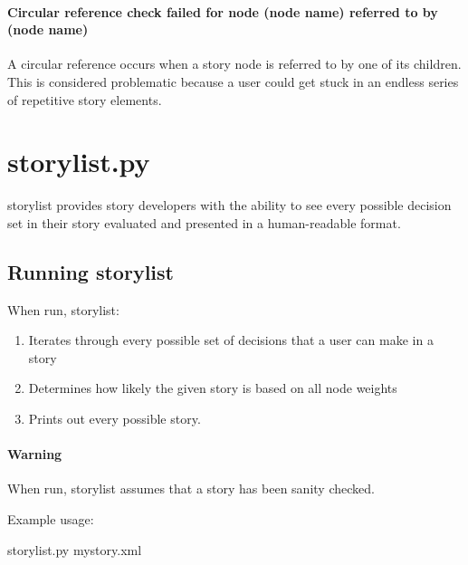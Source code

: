 \documentclass[12pt,letterpaper]{article}
\begin{document}
 \paragraph{Circular reference check failed for node (node name) referred to by (node name)}
 A circular reference occurs when a story node is referred to by one of its children. This is considered 
 problematic because a user could get stuck in an endless series of repetitive story elements.
 
 
 \section{storylist.py}
 storylist provides story developers with the ability to see every possible decision set in their story evaluated and
 presented in a human-readable format.
 
 \subsection{Running storylist}
 When run, storylist:
 \begin{enumerate}
 \item Iterates through every possible set of decisions that a user can make in a story
 \item Determines how likely the given story is based on all node weights
 \item Prints out every possible story.
 \end{enumerate}
 
 \paragraph{Warning} When run, storylist assumes that a story has been sanity checked.
 
 Example usage:
 \begin{center}
 storylist.py mystory.xml
 \end{center}
 
\end{document}
